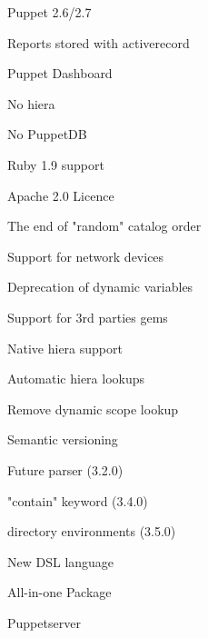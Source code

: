 \begin{iframe}
\item Puppet 2.6/2.7
\item Reports stored with activerecord
\item Puppet Dashboard
\item No hiera
\item No PuppetDB
\end{iframe}
\begin{iframe}
\item Ruby 1.9 support
\item Apache 2.0 Licence
\item The end of "random" catalog order
\item Support for network devices
\item Deprecation of dynamic variables
\end{iframe}
\begin{iframe}
\item Support for 3rd parties gems
\item Native hiera support
\item Automatic hiera lookups
\item Remove dynamic scope lookup
\item Semantic versioning
\end{iframe}
\begin{iframe}
\item Future parser (3.2.0)
\item "contain" keyword (3.4.0)
\item directory environments (3.5.0)
\end{iframe}
\begin{iframe}
\item New DSL language
\item All-in-one Package
\item Puppetserver
\end{iframe}

